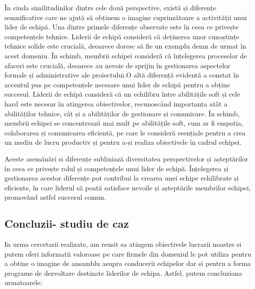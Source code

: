 \documentclass[a4paper, 12pt]{article}
\begin{document}
\begin{enumerate}[(1)]
	\quad În ciuda similitudinilor dintre cele două perspective, există și diferențe semnificative care ne ajută să obținem o imagine cuprinzătoare a activității unui lider de echipă. Una dintre primele diferențe observate este în ceea ce privește competențele tehnice. Liderii de echipă consideră că deținerea unor cunoștințe tehnice solide este crucială, deoarece doresc să fie un exemplu demn de urmat în acest domeniu. În schimb, membrii echipei consideră că înțelegerea proceselor de afaceri este crucială, deoarece au nevoie de sprijin în gestionarea aspectelor formale și administrative ale proiectului.O altă diferență evidentă a constat în accentul pus pe competențele necesare unui lider de echipă pentru a obține succesul. Liderii de echipă consideră că un echilibru între abilitățile soft și cele hard este necesar în atingerea obiectivelor, recunoscând importanța atât a abilităților tehnice, cât și a abilităților de gestionare și comunicare. În schimb, membrii echipei se concentrează mai mult pe abilitățile soft, cum ar fi empatia, colaborarea și comunicarea eficientă, pe care le consideră esențiale pentru a crea un mediu de lucru productiv și pentru a-și realiza obiectivele în cadrul echipei.

	\quad Aceste asemănări si diferențe subliniază diversitatea perspectivelor și așteptărilor în ceea ce privește rolul și competențele unui lider de echipă. Înțelegerea și gestionarea acestor diferențe pot contribui la crearea unei echipe echilibrate și eficiente, în care liderul să poată satisface nevoile și așteptările membrilor echipei, promovând astfel succesul comun.

	\end{enumerate}

	\subsection{ Concluzii- studiu de caz} 

	\quad In urma cercetarii realizate, am reusit sa atingem obiectivele lucrarii noastre si putem oferi informatii valoroase pe care firmele din domeniul le pot utiliza pentru a obtine o imagine de ansamblu asupra conducerii echipelor dar si pentru a forma programe de dezvoltare destinate liderilor de echipa. Astfel, putem concluziona urmatoarele:
\end{document}
